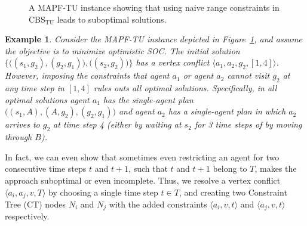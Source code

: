 \documentclass[jair,twoside,11pt,theapa]{article}
\newcommand{\tuple}[1]{\langle#1\rangle}
\newcommand{\sourcetargets}{\mathcal{S}}
\newcommand{\cbstu}{CBS$\mathrm{_{TU}}$\xspace}
\newcommand{\mapftu}{MAPF-TU\xspace}
\newtheorem{example}{Example}
\begin{document}
\begin{figure}[ht]
\centering
{}
\caption{A \mapftu instance showing that using naive range constraints in \cbstu leads to suboptimal solutions.
}
\label{fig:no-range-conflicts}
\end{figure}
\begin{example}
Consider the \mapftu instance depicted in Figure~\ref{fig:no-range-conflicts}, 
and assume the objective is to minimize optimistic SOC. 
The initial solution $\Big\{\big((s_1, g_2), (g_2, g_1)\big),\big((s_2, g_2)\big)\Big\}$ has a vertex conflict $\tuple{a_1,a_2,g_2,[1,4]}$.
However, imposing the constraints that agent $a_1$ or agent $a_2$ cannot visit $g_2$ at any time step in $[1,4]$ rules outs all optimal solutions. Specifically, in all optimal solutions agent $a_1$ has the single-agent plan $\big((s_1,A), (A,g_2), (g_2, g_1)\big)$ and agent $a_2$ has a single-agent plan in which $a_2$ arrives to $g_2$ at time step 4 (either by waiting at $s_2$ for 3 time steps of by moving through $B$).
\end{example}
In fact, we can even show that sometimes even restricting an agent for two consecutive time steps
$t$ and $t+1$, such that $t$ and $t+1$ belong to $T$, makes the approach suboptimal or even incomplete.
%
Thus, we resolve a vertex conflict $\tuple{a_i,a_j,v, T}$ by choosing a single time step $t \in T$, and creating two Constraint Tree (CT) nodes $N_i$ and $N_j$ with the added constraints $\tuple{a_i, v ,t}$ and $\tuple{a_j, v,t}$ respectively. 
\end{document}
